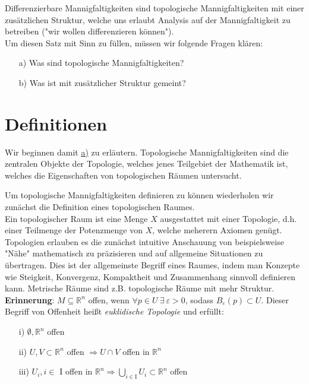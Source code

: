 Differenzierbare Mannigfaltigkeiten sind topologische Mannigfaltigkeiten mit einer zusätzlichen Struktur, welche uns erlaubt Analysis auf der Mannigfaltigkeit zu betreiben ("wir wollen differenzieren können").\\
Um diesen Satz mit Sinn zu füllen, müssen wir folgende Fragen klären:
\begin{itemize}
\label{item:frage1}
\item[a)]  Was sind topologische Mannigfaltigkeiten?
\label{item:frage2}
\item[b)]  Was ist mit zusätzlicher Struktur gemeint?
\end{itemize}

\section{Definitionen}
Wir beginnen damit \hyperref[item:frage1]{a)} zu erläutern.
Topologische Mannigfaltigkeiten sind die zentralen Objekte der Topologie, welches jenes Teilgebiet der Mathematik ist, welches die Eigenschaften von topologischen Räumen untersucht.

Um topologische Mannigfaltigkeiten definieren zu können wiederholen wir zunächst die Definition eines topologischen Raumes. \\
Ein topologischer Raum ist eine Menge $X$ ausgestattet mit einer Topologie, d.h. einer Teilmenge der Potenzmenge von $X$, welche meherern Axiomen genügt.
Topologien erlauben es die zunächst intuitive Anschauung von beispielsweise "Nähe" mathematisch zu präzisieren und auf allgemeine Situationen zu übertragen.
Dies ist der allgemeinste Begriff eines Raumes, indem man Konzepte wie Steigkeit, Konvergenz, Kompaktheit und Zusammenhang sinnvoll definieren kann. 
Metrische Räume sind z.B. topologische Räume mit mehr Struktur.
\phantom{.}\\
\textbf{Erinnerung}: $M \subseteq \mathbb{R}^n$ offen, wenn $\forall p \in U \ \exists \ \varepsilon>0$, sodass $B_{\varepsilon}(p) \subset U$. Dieser Begriff von Offenheit heißt \textit{euklidische Topologie} und erfüllt:
\begin{enumerate}
\item[i)] $\emptyset, \mathbb{R}^n$ offen
\item[ii)] $U, V \subset \mathbb{R}^n$ offen $\Rightarrow U \cap V$ offen in $\mathbb{R}^n$
\item [iii)] $U_i, i \in $ I offen in $\mathbb{R}^n \Rightarrow \bigcup\limits_{i \in \text{I}} U_i \subset \mathbb{R}^n$ offen
\end{enumerate} 

